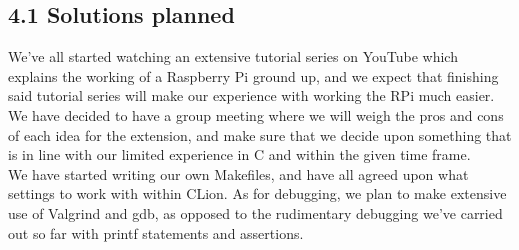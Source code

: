 \documentclass[a4paper, twoside]{report}
\begin{document}
\subsection*{4.1 Solutions planned}
We've all started watching an extensive tutorial series on YouTube which explains the working of a Raspberry Pi ground up, and we expect that finishing said tutorial series will make our experience with working the RPi much easier. \\
We have decided to have a group meeting where we will weigh the pros and cons of each idea for the extension, and make sure that we decide upon something that is in line with our limited experience in C and within the given time frame. \\
We have started writing our own Makefiles, and have all agreed upon what settings to work with within CLion. As for debugging, we plan to make extensive use of Valgrind and gdb, as opposed to  the rudimentary debugging we've carried out so far with printf statements and assertions. 
\end{document}
